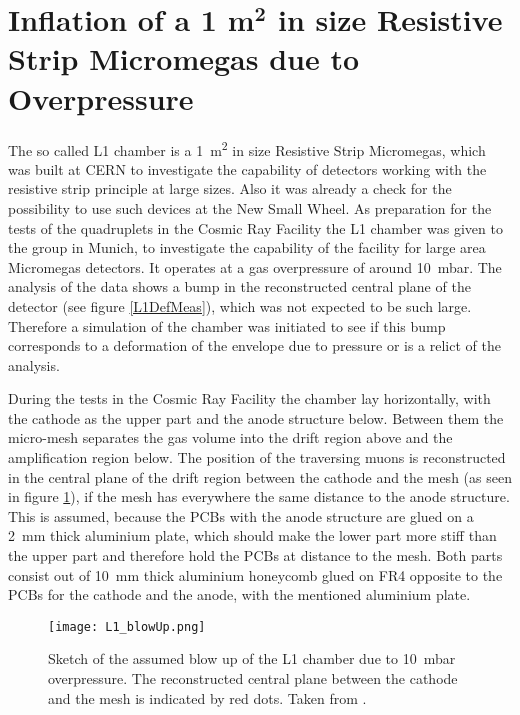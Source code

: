 \documentclass[
a4paper,                                %
twoside,                                %
BCOR1.4cm,                      %
10pt,                           %
headings=normal,                %
headsepline,                    %
clearplainpage, %
final,                                  %
div=14,
parskip=full,
openright,
bibliography=toc
]{scrreprt}
\begin{document}
\section{Inflation of a 1 m$^\mathbf{2}$ in size Resistive Strip Micromegas due to Overpressure}

The so called L1 chamber is a \SI{1}{\square\m} in size Resistive Strip Micromegas, which was built at CERN to investigate the capability of detectors working with the resistive strip principle at large sizes. Also it was already a check for the possibility to use such devices at the New Small Wheel. As preparation for the tests of the quadruplets in the Cosmic Ray Facility the L1 chamber was given to the group in Munich, to investigate the capability of the facility for large area Micromegas detectors. It operates at a gas overpressure of around \SI{10}{mbar}. The analysis of the data shows a bump in the reconstructed central plane of the detector (see figure \ref{L1DefMeas}), which was not expected to be such large. Therefore a simulation of the chamber was initiated to see if this bump corresponds to a deformation of the envelope due to pressure or is a relict of the analysis. 

During the tests in the Cosmic Ray Facility the chamber lay horizontally, with the cathode as the upper part and the anode structure below. Between them the micro-mesh separates the gas volume into the drift region above and the amplification region below. The position of the traversing muons is reconstructed in the central plane of the drift region between the cathode and the mesh (as seen in figure \ref{L1blowUpSketch}), if the mesh has everywhere the same distance to the anode structure. This is assumed, because the PCBs with the anode structure are glued on a \SI{2}{\mm} thick aluminium plate, which should make the lower part more stiff than the upper part and therefore hold the PCBs at distance to the mesh. Both parts consist out of \SI{10}{\mm} thick aluminium honeycomb glued on FR4 opposite to the PCBs for the cathode and the anode, with the mentioned aluminium plate.

\begin{figure}[H]
	\centering
	\texttt{[image: L1\_blowUp.png]}
	\caption{Sketch of the assumed blow up of the L1 chamber due to \SI{10}{mbar} overpressure. The reconstructed central plane between the cathode and the mesh is indicated by red dots. Taken from \cite{philippLthesis}.}
	\label{L1blowUpSketch}
\end{figure}
\end{document}
